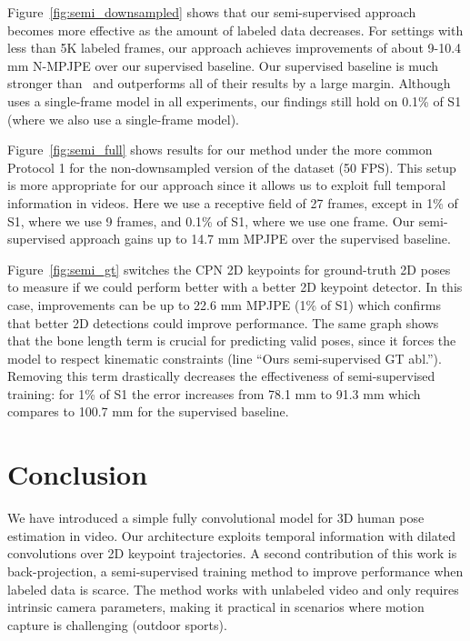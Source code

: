 \documentclass[10pt,twocolumn,letterpaper]{article}
\begin{document}
Figure~\ref{fig:semi_downsampled} shows that our semi-supervised approach becomes more effective as the amount of labeled data decreases.
For settings with less than 5K labeled frames, our approach achieves improvements of about 9-10.4 mm N-MPJPE over our supervised baseline.
Our supervised baseline is much stronger than~\cite{rhodin:unsupervised:2018} and outperforms all of their results by a large margin. Although \cite{rhodin:unsupervised:2018} uses a single-frame model in all experiments, our findings still hold on 0.1\% of S1 (where we also use a single-frame model).

Figure~\ref{fig:semi_full} shows results for our method under the more common Protocol 1 for the non-downsampled version of the dataset (50 FPS). This setup is more appropriate for our approach since it allows us to exploit full temporal information in videos. Here we use a receptive field of 27 frames, except in 1\% of S1, where we use 9 frames, and 0.1\% of S1, where we use one frame. Our semi-supervised approach gains up to 14.7 mm MPJPE over the supervised baseline.

Figure~\ref{fig:semi_gt} switches the CPN 2D keypoints for ground-truth 2D poses to measure if we could perform better with a better 2D keypoint detector.
In this case, improvements can be up to 22.6 mm MPJPE (1\% of S1) which confirms that better 2D detections could improve performance.
The same graph shows that the bone length term is crucial for predicting valid poses, since it forces the model to respect kinematic constraints (line ``Ours semi-supervised GT abl.'').
Removing this term drastically decreases the effectiveness of semi-supervised training: for 1\% of S1 the error increases from 78.1 mm to 91.3 mm which compares to 100.7 mm for the supervised baseline.



\section{Conclusion}
\label{sec:ccl_pose}

We have introduced a simple fully convolutional model for 3D human pose estimation in video. Our architecture exploits temporal information with dilated convolutions over 2D keypoint trajectories. A second contribution of this work is back-projection, a semi-supervised training method to improve performance when labeled data is scarce. 
The method works with unlabeled video and only requires intrinsic camera parameters, making it practical in scenarios where motion capture is challenging (\eg outdoor sports).
\end{document}
